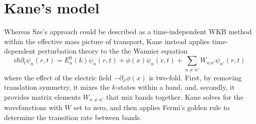 \section{Kane's model}
Whereas Sze's approach could be described as a time-independent WKB method within the effective mass picture of transport, Kane instead applies time-dependent perturbation theory to the the Wannier equation
$$i\hbar\partial_t\psi_n(r,t)=E_n^0(k)\psi_n(r,t)+\phi(x)\psi_n(r,t)+\sum_{n\neq n'} W_{n\,n'}\psi_{n'}(r,t)$$
where the effect of the electric field $-\partial_x\phi(x)$ is two-fold.  First, by removing translation symmetry, it mixes the $k$-states within a band, and, secondly, it provides matrix elements $W_{n\neq n'}$ that mix bands together.  Kane solves for the wavefunctions with $W$ set to zero, and then applies Fermi's golden rule to determine the transition rate between bands.